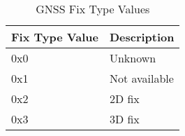 \begin{table*}[htb]
    \centering
    \begin{tabular}{@{}ll@{}}
        \toprule
        Fix Type Value & Description   \\
        \midrule
        0x0            & Unknown       \\
        0x1            & Not available \\
        0x2            & 2D fix        \\
        0x3            & 3D fix        \\
        \bottomrule
    \end{tabular}
    \caption{GNSS Fix Type Values}
    \label{table:gnss-fix-type}
\end{table*}
